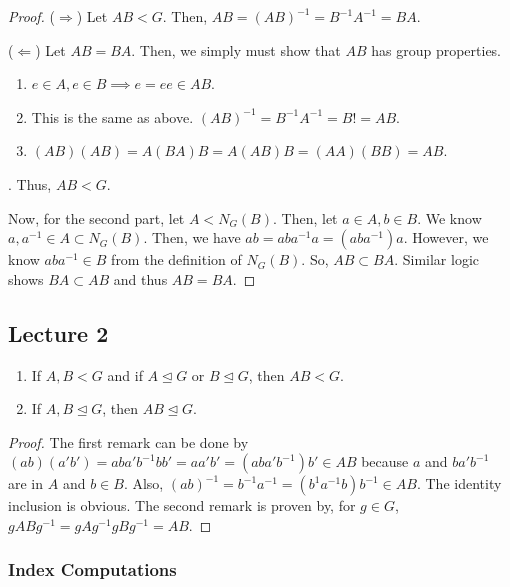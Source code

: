 \documentclass[11pt,leqno,oneside]{amsart}
\newcommand{\subgroup}{\mathrel{<}}
\newcommand{\normsubgroup}{\mathrel{\unlhd}}
\begin{document}
    \begin{proof}
        ($\Rightarrow$) Let $AB \subgroup G$. Then, $AB = (AB)^{-1} =
        B^{-1}A^{-1} = BA$.

        ($\Leftarrow$) Let $AB = BA$. Then, we simply must show that $AB$ has
        group properties.\begin{enumerate}
            \item $e \in A, e \in B \implies e = ee \in AB$.
            \item This is the same as above. $(AB)^{-1} = B^{-1}A^{-1} = B! = AB$.
            \item $(AB)(AB) = A(BA)B = A(AB)B = (AA)(BB) = AB$.
        \end{enumerate}. Thus, $AB \subgroup G$.

        Now, for the second part, let $A \subgroup N_G(B)$. Then, let $a \in A,
        b \in B$. We know $a,a^{-1} \in A \subset N_G(B)$. Then, we have $ab =
        aba^{-1}a = (aba^{-1})a$. However, we know $aba^{-1} \in B$ from the
        definition of $N_G(B)$. So, $AB \subset BA$. Similar logic shows $BA
        \subset AB$ and thus $AB = BA$.
    \end{proof}

    \subsection*{Lecture 2}
    \begin{rmk}
        \begin{enumerate}
            \item If $A,B \subgroup G$ and if $A \normsubgroup G$ or $B \normsubgroup G$, then $AB \subgroup G$.
            \item If $A,B \normsubgroup G$, then $AB \normsubgroup G$.
        \end{enumerate}
    \end{rmk}
    \begin{proof}
        The first remark can be done by $(ab)(a'b') = aba'b^{-1}bb' = aa'b' = (aba'b^{-1})b' \in AB$ because $a$ and $ba'b^{-1}$ are in $A$ and $b \in B$. Also, $(ab)^{-1} = b^{-1}a^{-1} = (b^{1}a^{-1}b)b^{-1} \in AB$. The identity inclusion is obvious.
        The second remark is proven by, for $g \in G$, $gABg^{-1} = gAg^{-1}gBg^{-1} = AB$.
    \end{proof}

    \subsubsection*{Index Computations}
\end{document}
